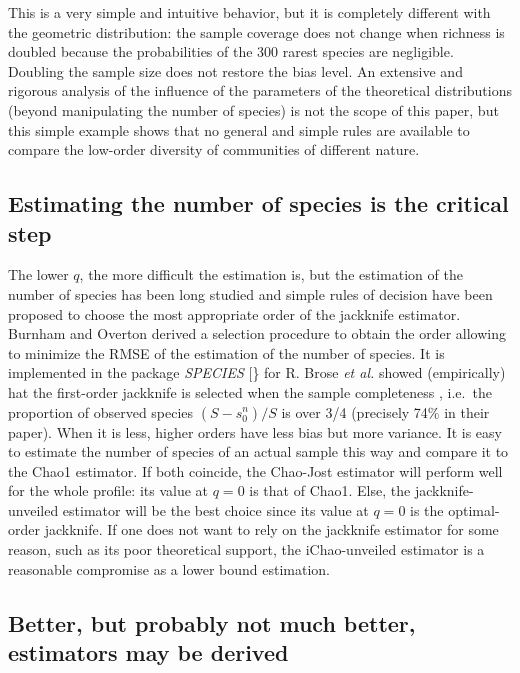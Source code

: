 \documentclass[fleqn,10pt]{latex/stylish_article} %
\begin{document}
This is a very simple and intuitive behavior, but it is completely different with the geometric distribution: the sample coverage does not change when richness is doubled because the probabilities of the 300 rarest species are negligible.
Doubling the sample size does not restore the bias level.
An extensive and rigorous analysis of the influence of the parameters of the theoretical distributions (beyond manipulating the number of species) is not the scope of this paper, but this simple example shows that no general and simple rules are available to compare the low-order diversity of communities of different nature.

\hypertarget{estimating-the-number-of-species-is-the-critical-step}{%
\subsection{Estimating the number of species is the critical step}\label{estimating-the-number-of-species-is-the-critical-step}}

The lower \(q\), the more difficult the estimation is, but the estimation of the number of species has been long studied and simple rules of decision have been proposed \citep{Burnham1979, Brose2003} to choose the most appropriate order of the jackknife estimator.
Burnham and Overton derived a selection procedure to obtain the order allowing to minimize the RMSE of the estimation of the number of species.
It is implemented in the package \emph{SPECIES} {[}\citet{Wang2011}\} for R.
Brose \emph{et al.} showed (empirically) hat the first-order jackknife is selected when the sample completeness \citep[terminology by][]{Beck2010}, i.e.~the proportion of observed species \((S-{s}^{n}_{0})/S\) is over 3/4 (precisely 74\% in their paper).
When it is less, higher orders have less bias but more variance.
It is easy to estimate the number of species of an actual sample this way and compare it to the Chao1 estimator.
If both coincide, the Chao-Jost estimator will perform well for the whole profile: its value at \(q=0\) is that of Chao1.
Else, the jackknife-unveiled estimator will be the best choice since its value at \(q=0\) is the optimal-order jackknife.
If one does not want to rely on the jackknife estimator for some reason, such as its poor theoretical support, the iChao-unveiled estimator is a reasonable compromise as a lower bound estimation.

\hypertarget{better-but-probably-not-much-better-estimators-may-be-derived}{%
\subsection{Better, but probably not much better, estimators may be derived}\label{better-but-probably-not-much-better-estimators-may-be-derived}}
\end{document}
